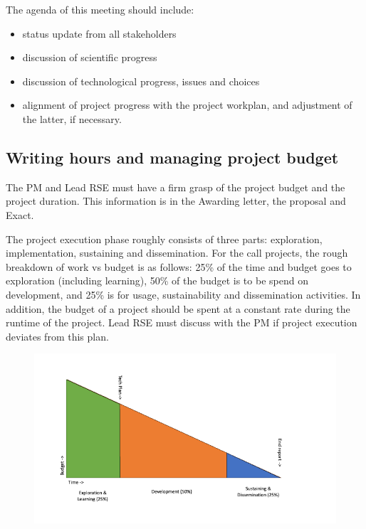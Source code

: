 \documentclass[11pt]{article}
\begin{document}
The agenda of this meeting should include:
\begin{itemize}
\item status update from all stakeholders
\item discussion of scientific progress
\item discussion of technological progress, issues and choices
\item alignment of project progress with the project workplan, and adjustment of the latter, if necessary.
\end{itemize}

\subsection{Writing hours and managing project budget}
\label{sec:exec:budget}
The PM and Lead RSE must have a firm grasp of the project budget and the project duration. This information is in the
Awarding letter, the proposal and Exact.

The project execution phase roughly consists of three parts: exploration, implementation, sustaining and dissemination.
For the call projects, the rough breakdown of work vs budget is as follows: 25\% of the time and budget goes to
exploration (including learning), 50\% of the budget is to be spend on development, and 25\% is for usage,
sustainability and dissemination activities. In addition, the budget of a project should be spent at a constant rate
during the runtime of the project. Lead RSE must discuss with the PM if project execution deviates from this plan.

\begin{figure}[!h]
    \centering
    \includegraphics[scale=0.45]{img/budget-stages.png}
\end{figure}
\end{document}
